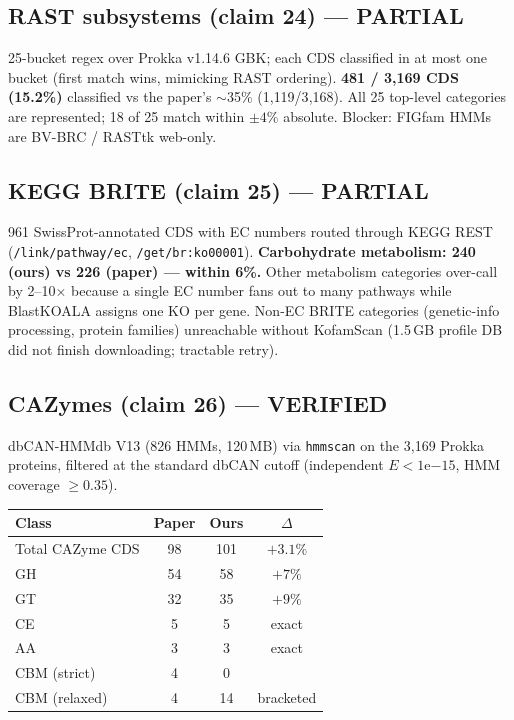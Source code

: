 \documentclass[11pt]{article}
\begin{document}
\subsection{RAST subsystems (claim 24) --- PARTIAL}
25-bucket regex over Prokka v1.14.6 GBK; each CDS classified in at most one bucket (first match wins, mimicking RAST ordering). \textbf{481 / 3{,}169 CDS (15.2\%)} classified vs the paper's $\sim$35\% (1{,}119/3{,}168). All 25 top-level categories are represented; 18 of 25 match within $\pm4\%$ absolute. Blocker: FIGfam HMMs are BV-BRC / RASTtk web-only.

\subsection{KEGG BRITE (claim 25) --- PARTIAL}
961 SwissProt-annotated CDS with EC numbers routed through KEGG REST (\texttt{/link/pathway/ec}, \texttt{/get/br:ko00001}). \textbf{Carbohydrate metabolism: 240 (ours) vs 226 (paper) --- within 6\%.} Other metabolism categories over-call by 2--10$\times$ because a single EC number fans out to many pathways while BlastKOALA assigns one KO per gene. Non-EC BRITE categories (genetic-info processing, protein families) unreachable without KofamScan (1.5\,GB profile DB did not finish downloading; tractable retry).

\subsection{CAZymes (claim 26) --- VERIFIED}
dbCAN-HMMdb V13 (826 HMMs, 120\,MB) via \texttt{hmmscan} on the 3{,}169 Prokka proteins, filtered at the standard dbCAN cutoff (independent $E<1\mathrm{e}{-15}$, HMM coverage $\ge 0.35$).

\begin{center}
\begin{tabular}{@{}lccc@{}}
\toprule
Class & Paper & Ours & $\Delta$ \\
\midrule
Total CAZyme CDS & 98 & 101 & $+3.1\%$ \\
GH & 54 & 58 & $+7\%$ \\
GT & 32 & 35 & $+9\%$ \\
CE & 5 & 5 & exact \\
AA & 3 & 3 & exact \\
CBM (strict) & 4 & 0 & \\
CBM (relaxed) & 4 & 14 & bracketed \\
\bottomrule
\end{tabular}
\end{center}
\end{document}
